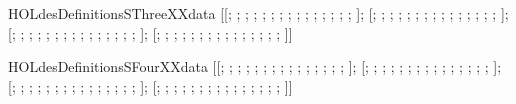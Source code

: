 \begin{SaveVerbatim}{HOLdesDefinitionsSThreeXXdata}
\HOLTokenTurnstile{}  \HOLSymConst{=}
   [[; ; ; ; ; ; ; ; ; ; ; ; ; ; ; ];
    [; ; ; ; ; ; ; ; ; ; ; ; ; ; ; ];
    [; ; ; ; ; ; ; ; ; ; ; ; ; ; ; ];
    [; ; ; ; ; ; ; ; ; ; ; ; ; ; ; ]]
\end{SaveVerbatim}
\newcommand{\HOLdesDefinitionsSThreeXXdata}{\UseVerbatim{HOLdesDefinitionsSThreeXXdata}}
\begin{SaveVerbatim}{HOLdesDefinitionsSFourXXdata}
\HOLTokenTurnstile{}  \HOLSymConst{=}
   [[; ; ; ; ; ; ; ; ; ; ; ; ; ; ; ];
    [; ; ; ; ; ; ; ; ; ; ; ; ; ; ; ];
    [; ; ; ; ; ; ; ; ; ; ; ; ; ; ; ];
    [; ; ; ; ; ; ; ; ; ; ; ; ; ; ; ]]
\end{SaveVerbatim}
\newcommand{\HOLdesDefinitionsSFourXXdata}{\UseVerbatim{HOLdesDefinitionsSFourXXdata}}
